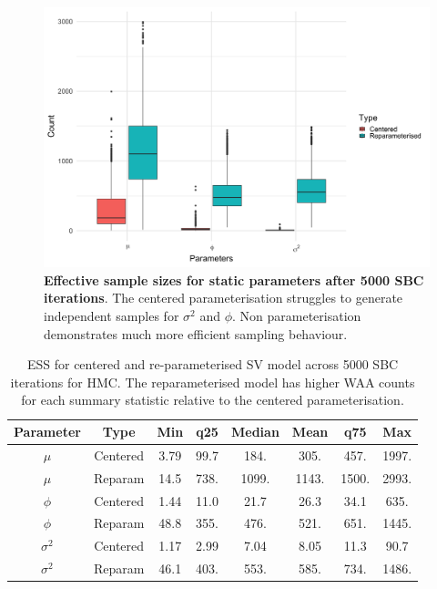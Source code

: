\documentclass[12pt, a4paper]{article}
\begin{document}
    \begin{figure}[H]
        \centering
        \includegraphics[scale=0.09]{results/hmc_ess.png}
        \caption{\textbf{Effective sample sizes for static parameters after 5000 SBC iterations}. The centered parameterisation struggles to generate independent samples for $\sigma^2$ and $\phi$. Non parameterisation demonstrates much more efficient sampling behaviour.}
        \label{fig:hmcess}
    \end{figure}

    \begin{table}[H]
        \centering
        \begin{tabular}{|c|c|c|c|c|c|c|c|} \hline 
        Parameter &  Type&Min& q25&  Median& Mean & q75&Max\\ \hline 
        $\mu$&  Centered&3.79 & 99.7 & 184. & 305. & 457. & 1997.  \\
     $\mu$&  Reparam&14.5 & 738. & 1099. & 1143. & 1500. & 2993.  \\\hline 
     $\phi$&  Centered&1.44 & 11.0 & 21.7 & 26.3 & 34.1 & 635.  \\
     $\phi$&  Reparam&48.8 & 355. & 476. & 521. & 651. & 1445.   \\ \hline 
     $\sigma^2$&  Centered& 1.17 & 2.99 & 7.04 & 8.05 & 11.3 & 90.7 \\ 
     $\sigma^2$&  Reparam&46.1 & 403. & 553. & 585. & 734. & 1486. \\ \hline
        \end{tabular}
        \caption{ESS for centered and re-parameterised SV model across 5000 SBC iterations for HMC. The reparameterised model has higher WAA counts for each summary statistic relative to the centered parameterisation.}
        \label{tab:hmcess}
    \end{table}
\end{document}
